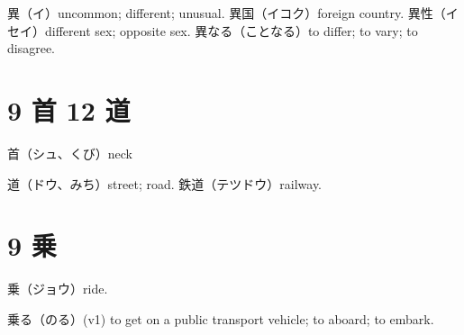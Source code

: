 異（イ）uncommon; different; unusual.
異国（イコク）foreign country.
異性（イセイ）different sex; opposite sex.
異なる（ことなる）to differ; to vary; to disagree.

\section{9 首 12 道}

首（シュ、くび）neck

道（ドウ、みち）street; road.
鉄道（テツドウ）railway.

\section{9 乗}

乗（ジョウ）ride.

乗る（のる）(v1) to get on a public transport vehicle; to aboard; to embark.
